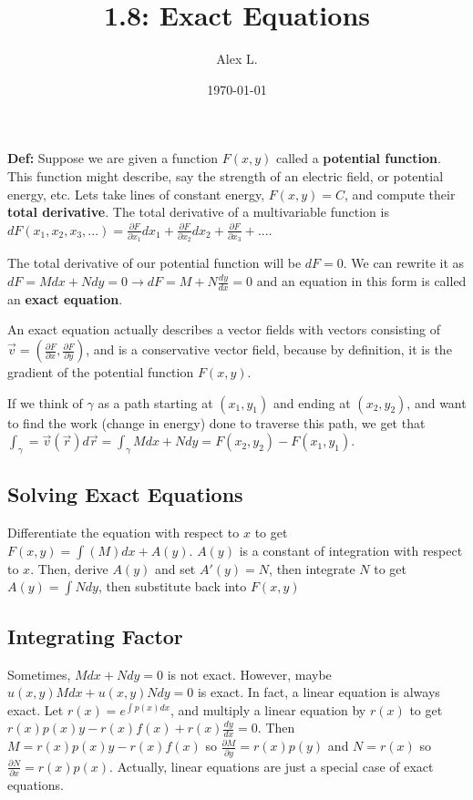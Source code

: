 \documentclass{article}
\title{1.8: Exact Equations}
\author{Alex L.}
\date{\today}
\begin{document}
\maketitle

\textbf{Def:} Suppose we are given a function $F(x,y)$ called a \textbf{potential function}. This function might describe, say the strength of an electric field, or potential energy, etc. Lets take lines of constant energy, $F(x,y) = C$, and compute their \textbf{total derivative}. The total derivative of a multivariable function is $dF(x_1,x_2,x_3, ...)  = \frac{\partial F}{\partial x_1} dx_1 + \frac{\partial F}{\partial x_2} dx_2 + \frac{\partial F}{\partial x_3} + ...$.

The total derivative of our potential function will be $dF = 0$. We can rewrite it as $dF = M dx + N dy = 0 \rightarrow dF = M + N \frac{dy}{dx} = 0$ and an equation in this form is called an \textbf{exact equation}.

An exact equation actually describes a vector fields with vectors consisting of $\vec{v} = (\frac{\partial F}{\partial x}, \frac{\partial F}{\partial y})$, and is a conservative vector field, because by definition, it is the gradient of the potential function $F(x,y)$. 

If we think of $\gamma$ as a path starting at $(x_1,y_1)$ and ending at $(x_2,y_2)$, and want to find the work (change in energy) done to traverse this path, we get that $\int_\gamma = \vec{v}(\vec{r}) d\vec{r} = \int_\gamma M dx + N dy = F(x_2,y_2) - F(x_1,y_1)$. 

\subsection{Solving Exact Equations}

Differentiate the equation with respect to $x$ to get $F(x,y) = \int(M) dx + A(y)$. $A(y)$ is a constant of integration with respect to $x$. Then, derive $A(y)$ and set $A'(y) = N$, then integrate $N$ to get $A(y) = \int N dy$, then substitute back into $F(x,y)$

\subsection{Integrating Factor}

Sometimes, $M dx + N dy = 0$ is not exact. However, maybe $u(x,y)M dx + u(x,y)N dy = 0$ is exact. In fact, a linear equation is always exact. Let $r(x) = e^{\int p(x) dx}$, and multiply a linear equation by $r(x)$ to get $r(x)p(x)y - r(x)f(x) + r(x)\frac{dy}{dx} = 0$. Then $M = r(x)p(x)y - r(x)f(x)$ so $\frac{\partial M}{\partial y} = r(x)p(y)$ and $N = r(x)$ so $\frac{\partial N}{\partial x} = r(x)p(x)$. Actually, linear equations are just a special case of exact equations. 
\end{document}
